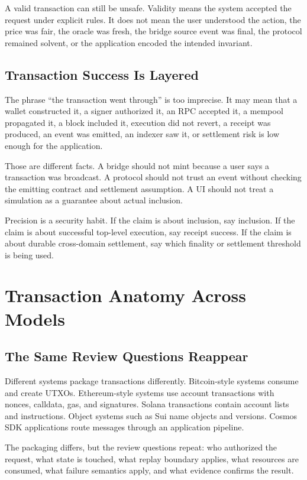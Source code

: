 A valid transaction can still be unsafe. Validity means the system accepted the request under explicit rules. It does not mean the user understood the action, the price was fair, the oracle was fresh, the bridge source event was final, the protocol remained solvent, or the application encoded the intended invariant.

\subsection{Transaction Success Is Layered}

The phrase ``the transaction went through'' is too imprecise. It may mean that a wallet constructed it, a signer authorized it, an RPC accepted it, a mempool propagated it, a block included it, execution did not revert, a receipt was produced, an event was emitted, an indexer saw it, or settlement risk is low enough for the application.

Those are different facts. A bridge should not mint because a user says a transaction was broadcast. A protocol should not trust an event without checking the emitting contract and settlement assumption. A UI should not treat a simulation as a guarantee about actual inclusion.

Precision is a security habit. If the claim is about inclusion, say inclusion. If the claim is about successful top-level execution, say receipt success. If the claim is about durable cross-domain settlement, say which finality or settlement threshold is being used.

\section{Transaction Anatomy Across Models}

\subsection{The Same Review Questions Reappear}

Different systems package transactions differently. Bitcoin-style systems consume and create UTXOs. Ethereum-style systems use account transactions with nonces, calldata, gas, and signatures. Solana transactions contain account lists and instructions. Object systems such as Sui name objects and versions. Cosmos SDK applications route messages through an application pipeline.

The packaging differs, but the review questions repeat: who authorized the request, what state is touched, what replay boundary applies, what resources are consumed, what failure semantics apply, and what evidence confirms the result.

